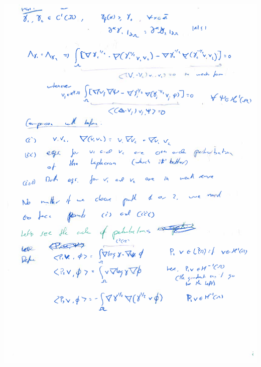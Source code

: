 \documentclass{article}
\begin{document}
\includegraphics[width=\textwidth]{images/4.png}
\end{document}
